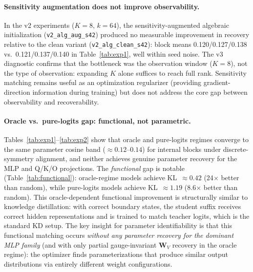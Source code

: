 \documentclass{article}
\newcommand{\bW}{\mathbf{W}}
\begin{document}
\paragraph{Sensitivity augmentation does not improve observability.}
In the v2 experiments ($K{=}8$, $k{=}64$), the sensitivity-augmented algebraic initialization (\texttt{v2\_alg\_aug\_s42}) produced no measurable improvement in recovery relative to the clean variant (\texttt{v2\_alg\_clean\_s42}): block means 0.120/0.127/0.138 vs.~0.121/0.137/0.140 in Table~\ref{tab:exp1}, well within seed noise.  The v3 diagnostic confirms that the bottleneck was the observation window ($K{=}8$), not the type of observation: expanding $K$ alone suffices to reach full rank.  Sensitivity matching remains useful as an optimization regularizer (providing gradient-direction information during training) but does not address the core gap between observability and recoverability.

\paragraph{Oracle vs.\ pure-logits gap: functional, not parametric.}
Tables~\ref{tab:exp1}--\ref{tab:exp2} show that oracle and pure-logits regimes converge to the same parameter cosine band ($\approx 0.12$--$0.14$) for internal blocks under discrete-symmetry alignment, and neither achieves genuine parameter recovery for the MLP and Q/K/O projections.  The \emph{functional} gap is notable (Table~\ref{tab:functional}): oracle-regime models achieve KL~$\approx 0.42$ (24$\times$ better than random), while pure-logits models achieve KL~$\approx 1.19$ (8.6$\times$ better than random).  This oracle-dependent functional improvement is structurally similar to knowledge distillation: with correct boundary states, the student suffix receives correct hidden representations and is trained to match teacher logits, which is the standard KD setup.  The key insight for parameter identifiability is that this functional matching occurs \emph{without any parameter recovery for the dominant MLP family} (and with only partial gauge-invariant $\bW_V$ recovery in the oracle regime): the optimizer finds parameterizations that produce similar output distributions via entirely different weight configurations.
\end{document}

